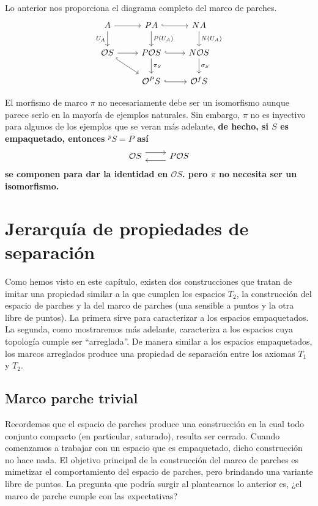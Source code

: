Lo anterior nos proporciona el diagrama completo del marco de parches.
\[\begin{tikzcd}
	A & PA & NA \\
	{\mathcal{O}S} & {P\mathcal{O}S} & {N\mathcal{O}S} \\
	& {\mathcal{O}^PS} & {\mathcal{O}^fS}
	\arrow[from=1-1, to=1-2]
	\arrow["{U_A}"', from=1-1, to=2-1]
	\arrow[hook, from=1-2, to=1-3]
	\arrow["{P(U_A)}", from=1-2, to=2-2]
	\arrow["{N(U_A)}", from=1-3, to=2-3]
	\arrow[from=2-1, to=2-2]
	\arrow[hook, from=2-1, to=3-2]
	\arrow[hook, from=2-2, to=2-3]
	\arrow["{\pi_S}", from=2-2, to=3-2]
	\arrow["{\sigma_S}", from=2-3, to=3-3]
	\arrow[hook, from=3-2, to=3-3]
\end{tikzcd}\]

El morfismo de marco $\pi$ no necesariamente debe ser un isomorfismo aunque parece serlo en la mayoría de ejemplos naturales. Sin embargo, $\pi$ no es inyectivo para algunos de los ejemplos que se veran más adelante, \textbf{de hecho, si $S$ es empaquetado, entonces $^pS=P$ así}
\[\begin{tikzcd}
	{\mathcal{O}S} & {P\mathcal{O}S}
	\arrow[shift left=2, from=1-1, to=1-2]
	\arrow[shift left=2, from=1-2, to=1-1]
\end{tikzcd}\]
\textbf{se componen para dar la identidad en $\mathcal{O}S$. pero $\pi$ no necesita ser un isomorfismo.}

\section{Jerarquía de propiedades de separación}\label{Marcos arreglados}

Como hemos visto en este capítulo, existen dos construcciones que tratan de imitar una propiedad similar a la que cumplen los espacios $T_2$, la construcción del espacio de parches y la del marco de parches (una sensible a puntos y la otra libre de puntos). La primera sirve para caracterizar a los espacios empaquetados. La segunda, como mostraremos más adelante, caracteriza a los espacios cuya topología cumple ser ``arreglada''. De manera similar a los espacios empaquetados, los marcos arreglados produce una propiedad de separación entre los axiomas $T_1$ y $T_2$.

\subsection{Marco parche trivial}

Recordemos que el espacio de parches produce una construcción en la cual todo conjunto compacto (en particular, saturado), resulta ser cerrado. Cuando comenzamos a trabajar con un espacio que es empaquetado, dicho construcción no hace nada. El objetivo principal de la construcción del marco de parches es mimetizar el comportamiento del espacio de parches, pero brindando una variante libre de puntos. La pregunta que podría surgir al plantearnos lo anterior es, ¿el marco de parche cumple con las expectativas?\\

